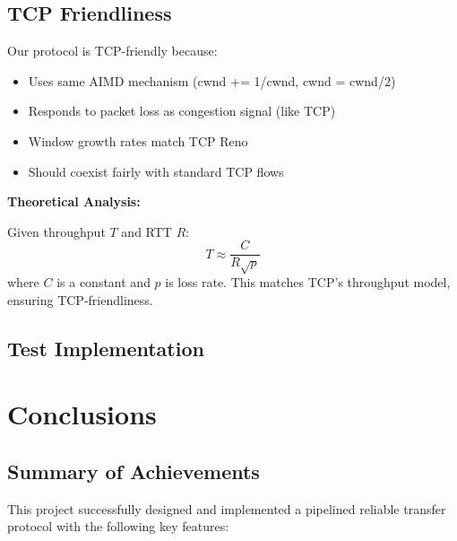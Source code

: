 \documentclass[11pt,a4paper]{article}
\begin{document}
\subsection{TCP Friendliness}

Our protocol is TCP-friendly because:
\begin{itemize}
    \item Uses same AIMD mechanism (cwnd += 1/cwnd, cwnd = cwnd/2)
    \item Responds to packet loss as congestion signal (like TCP)
    \item Window growth rates match TCP Reno
    \item Should coexist fairly with standard TCP flows
\end{itemize}

\textbf{Theoretical Analysis:}

Given throughput $T$ and RTT $R$:
\begin{equation}
T \approx \frac{C}{R\sqrt{p}}
\end{equation}
where $C$ is a constant and $p$ is loss rate. This matches TCP's throughput model, ensuring TCP-friendliness.

\subsection{Test Implementation}

\section{Conclusions}

\subsection{Summary of Achievements}

This project successfully designed and implemented a pipelined reliable transfer protocol with the following key features:
\end{document}
